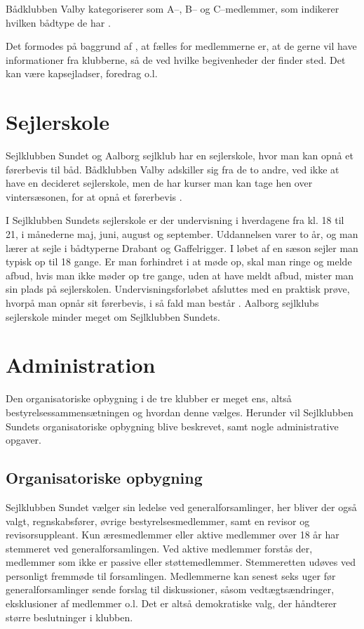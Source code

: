 Bådklubben Valby kategoriserer som A--, B-- og C--medlemmer, som indikerer hvilken bådtype de har
\citep{badklubben_valby_love}.

Det formodes på baggrund af , at fælles for medlemmerne er, at de gerne vil have informationer fra klubberne, så de ved hvilke begivenheder der finder sted. 
Det kan være kapsejladser, foredrag o.l.


\section{Sejlerskole}\label{sec:sejlerskole}

Sejlklubben Sundet og Aalborg sejlklub har en sejlerskole, hvor man kan opnå et førerbevis til båd. 
Bådklubben Valby adskiller sig fra de to andre, ved ikke at have en decideret sejlerskole, men de har kurser man kan tage hen over vintersæsonen, for at opnå et førerbevis \citep{baedklubben_valby_duelighedsbevis}.

I Sejlklubben Sundets sejlerskole er der undervisning i hverdagene fra kl. 18 til 21, i månederne
maj, juni, august og september. 
Uddannelsen varer to år, og man lærer at sejle i bådtyperne Drabant og Gaffelrigger. 
I løbet af en sæson sejler man typisk op til 18 gange. 
Er man forhindret i at møde op, skal man ringe og melde afbud, hvis man ikke møder op tre gange, uden at have meldt afbud, mister man sin plads på sejlerskolen.
Undervisningsforløbet afsluttes med en praktisk prøve, hvorpå man opnår sit førerbevis, i så
fald man består \citep{Sundet}. 
Aalborg sejlklubs sejlerskole minder meget om Sejlklubben Sundets.


\section{Administration}\label{sec:organisatoriske-opbygning}

Den organisatoriske opbygning i de tre klubber er meget ens, altså bestyrelsessammensætningen og hvordan denne
vælges. Herunder vil Sejlklubben Sundets organisatoriske opbygning blive beskrevet, samt nogle administrative
opgaver.


\subsection{Organisatoriske opbygning}\label{subsec:organisatoriske-opbygning}

Sejlklubben Sundet vælger sin ledelse ved generalforsamlinger, her bliver der også valgt, regnskabsfører, øvrige bestyrelsesmedlemmer, samt en revisor og revisorsuppleant. Kun æresmedlemmer eller aktive medlemmer over 18 år har stemmeret ved generalforsamlingen. Ved aktive medlemmer forstås der, medlemmer som ikke er
passive eller støttemedlemmer. Stemmeretten udøves ved personligt fremmøde til forsamlingen. Medlemmerne kan
senest seks uger før generalforsamlinger sende forslag til diskussioner, såsom vedtægtsændringer, eksklusioner
af medlemmer o.l. Det er altså demokratiske valg, der håndterer større beslutninger i klubben.


